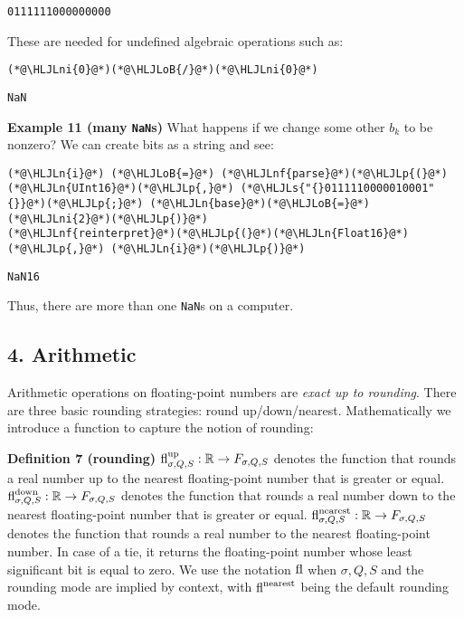 \documentclass[12pt,a4paper]{article}
\newcommand{\HLJLn}[1]{#1}
\newcommand{\HLJLnf}[1]{\textcolor[RGB]{66,102,213}{#1}}
\newcommand{\HLJLs}[1]{\textcolor[RGB]{201,61,57}{#1}}
\newcommand{\HLJLni}[1]{\textcolor[RGB]{59,151,46}{#1}}
\newcommand{\HLJLoB}[1]{\textcolor[RGB]{102,102,102}{\textbf{#1}}}
\newcommand{\HLJLp}[1]{#1}
\begin{document}
\begin{lstlisting}
0111111000000000
\end{lstlisting}


These are needed for undefined algebraic operations such as:


\begin{lstlisting}
(*@\HLJLni{0}@*)(*@\HLJLoB{/}@*)(*@\HLJLni{0}@*)
\end{lstlisting}

\begin{lstlisting}
NaN
\end{lstlisting}


\textbf{Example  11 (many \texttt{NaN}s)} What happens if we change some other $b_k$ to be nonzero? We can create bits as a string and see:


\begin{lstlisting}
(*@\HLJLn{i}@*) (*@\HLJLoB{=}@*) (*@\HLJLnf{parse}@*)(*@\HLJLp{(}@*)(*@\HLJLn{UInt16}@*)(*@\HLJLp{,}@*) (*@\HLJLs{"{}0111110000010001"{}}@*)(*@\HLJLp{;}@*) (*@\HLJLn{base}@*)(*@\HLJLoB{=}@*)(*@\HLJLni{2}@*)(*@\HLJLp{)}@*)
(*@\HLJLnf{reinterpret}@*)(*@\HLJLp{(}@*)(*@\HLJLn{Float16}@*)(*@\HLJLp{,}@*) (*@\HLJLn{i}@*)(*@\HLJLp{)}@*)
\end{lstlisting}

\begin{lstlisting}
NaN16
\end{lstlisting}


Thus, there are more than one \texttt{NaN}s on a computer.

\subsection{4. Arithmetic}
Arithmetic operations on floating-point numbers are  \emph{exact up to rounding}. There are three basic rounding strategies: round up/down/nearest. Mathematically we introduce a function to capture the notion of rounding:

\textbf{Definition 7 (rounding)} ${\rm fl}^{\rm up}_{\ensuremath{\sigma},Q,S} : \mathbb R \rightarrow F_{\ensuremath{\sigma},Q,S}$ denotes the function that rounds a real number up to the nearest floating-point number that is greater or equal. ${\rm fl}^{\rm down}_{\ensuremath{\sigma},Q,S} : \mathbb R \rightarrow F_{\ensuremath{\sigma},Q,S}$ denotes the function that rounds a real number down to the nearest floating-point number that is greater or equal. ${\rm fl}^{\rm nearest}_{\ensuremath{\sigma},Q,S} : \mathbb R \rightarrow F_{\ensuremath{\sigma},Q,S}$ denotes the function that rounds a real number to the nearest floating-point number. In case of a tie, it returns the floating-point number whose least significant bit is equal to zero. We use the notation ${\rm fl}$ when $\ensuremath{\sigma},Q,S$ and the rounding mode are implied by context, with ${\rm fl}^{\rm nearest}$ being the default rounding mode.
\end{document}
